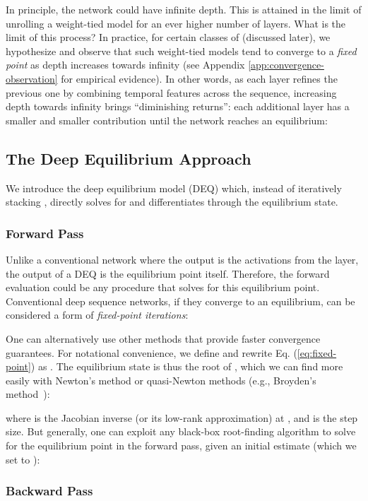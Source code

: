 \documentclass{article}
\begin{document}
In principle, the network could have infinite depth. This is attained in the limit of unrolling a weight-tied model for an ever higher number of layers. What is the limit of this process? In practice, for certain classes of  (discussed later), we hypothesize and observe that such weight-tied models tend to converge to a \emph{fixed point} as depth increases towards infinity (see Appendix \ref{app:convergence-observation} for empirical evidence). In other words, as each layer refines the previous one by combining temporal features across the sequence, increasing depth towards infinity brings ``diminishing returns'': each additional layer has a smaller and smaller contribution until the network reaches an equilibrium:


\subsection{The Deep Equilibrium Approach}
\label{subsec:equm}

We introduce the deep equilibrium model (DEQ) which, instead of iteratively stacking , directly solves for and differentiates through the equilibrium state.

\subsubsection{Forward Pass}
\label{subsubsec:forward}

Unlike a conventional network where the output is the activations from the  layer, the output of a DEQ is the equilibrium point itself.  Therefore, the forward evaluation could be any procedure that solves for this equilibrium point.  Conventional deep sequence networks, if they converge to an equilibrium, can be considered a form of \emph{fixed-point iterations}:

One can alternatively use other methods that provide faster convergence guarantees. For notational convenience, we define  and rewrite Eq. (\ref{eq:fixed-point}) as .
The equilibrium state  is thus the root of , which we can find more easily with Newton's method or quasi-Newton methods (e.g., Broyden's method~\citep{broyden1965class}):

where  is the Jacobian inverse (or its low-rank approximation) at , and  is the step size. But generally, one can exploit any black-box root-finding algorithm to solve for the equilibrium point in the forward pass, given an initial estimate  (which we set to ): 


\subsubsection{Backward Pass}
\label{subsubsec:backward}
\end{document}
